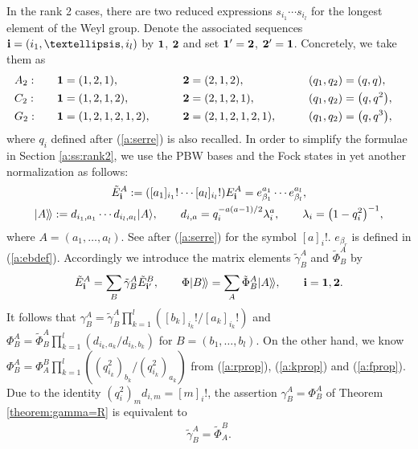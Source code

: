 \documentclass[11pt]{article}
\begin{document}
In the rank 2 cases,
there are two reduced expressions
$s_{i_1}\cdots s_{i_l}$ for the longest element of the
Weyl group.
Denote the associated sequences
${\bf i} = (i_1,\ldots, i_l)$  by ${\bf 1}$, ${\bf 2}$  and
set ${\bf 1}' = {\bf 2}$, ${\bf 2}' = {\bf 1}$.
Concretely, we take them as
\begin{alignat*}{5}
& A_2:  \quad && {\bf 1}=(1,2,1),\qquad &&{\bf 2}=(2,1,2), \qquad &&(q_1,q_2)=(q,q),& \\
& C_2: \quad && {\bf 1}=(1,2,1,2),\qquad &&{\bf 2}=(2,1,2,1), \qquad &&(q_1,q_2)=\big(q,q^2\big),& \\
& G_2: \quad && {\bf 1}=(1,2,1,2,1,2),\qquad &&{\bf 2}=(2,1,2,1,2,1), \qquad &&(q_1,q_2)=\big(q,q^3\big),&
\end{alignat*}
where $q_i$ def\/ined after (\ref{a:serre}) is also recalled.
In order to simplify the formulae in
Section \ref{a:ss:rank2}, we use the PBW bases and the
Fock states in yet another normalization as follows:
\begin{gather}
{\tilde E}^A_{\bf i}  := ([a_1]_{i_1}!\cdots [a_l]_{i_l}!) E^A_{\bf i}
= e^{a_1}_{\beta_1}\cdots e^{a_l}_{\beta_l}, \nonumber\\
|A\rangle\!\rangle  := d_{i_1,a_1}\cdots d_{i_l,a_l}|A\rangle,\qquad
d_{i,a} = q^{-a(a-1)/2}_i\lambda^a_i,\qquad
\lambda_i = \big(1-q_i^2\big)^{-1},\label{a:kett}
\end{gather}
where $A=(a_1,\ldots, a_l)$.
See after (\ref{a:serre}) for the symbol $[a]_i!$.
$e_{\beta_r}$ is def\/ined in (\ref{a:ebdef}).
Accordingly we introduce the matrix elements ${\tilde \gamma}^A_B$ and
${\tilde \Phi}^A_B$ by
\begin{gather*}
{\tilde E}^A_{\bf i} =\sum_B {\tilde \gamma}^A_B
{\tilde E}^B_{{\bf i}'},\qquad
\Phi |B\rangle\!\rangle=\sum_A {\tilde \Phi}^A_B |A\rangle\!\rangle,
\qquad {\bf i}={\bf 1}, {\bf 2}.
\end{gather*}
It follows that
$\gamma^A_B =
{\tilde \gamma}^A_B\prod\limits_{k=1}^l([b_k]_{i_k}!/[a_k]_{i_k}!)$
and
$\Phi^A_B=
{\tilde \Phi}^A_B\prod\limits_{k=1}^l(d_{i_k,a_k}/d_{i_k,b_k})$
for $B=(b_1,\ldots, b_l)$.
On the other hand, we know
$\Phi^A_B=\Phi^B_A\prod\limits_{k=1}^l((q_{i_k}^2)_{b_k}/(q_{i_k}^2)_{a_k})$
from (\ref{a:rprop}), (\ref{a:kprop}) and (\ref{a:fprop}).
Due to the identity
$(q_i^2)_md_{i,m}=[m]_i!$,
the assertion $\gamma^A_B=\Phi^A_B$
of Theorem \ref{theorem:gamma=R} is equivalent to
\begin{gather}\label{a:gyaku}
{\tilde \gamma}^A_B={\tilde \Phi^B_A}.
\end{gather}
\end{document}
